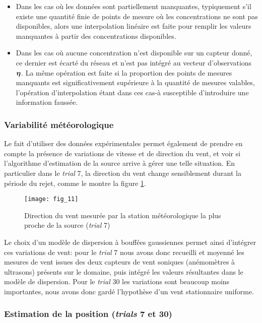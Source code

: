  \begin{itemize}
 	\item Dans les cas où les données sont partiellement manquantes, typiquement s'il existe une quantité finie de points de mesure où les concentrations ne sont pas disponibles, alors une interpolation linéaire est faite pour remplir les valeurs manquantes à partir des concentrations disponibles.
 	\item Dans les cas où aucune concentration n'est disponible sur un capteur donné, ce dernier est écarté du réseau et n'est pas intégré au vecteur d'observations ${\bm{\eta}}$. La même opération est faite si la proportion des points de mesures manquants est significativement supérieure à la quantité de mesures valables, l'opération d'interpolation étant dans ces cas-à susceptible d'introduire une information faussée.\\
 \end{itemize}
 
\subsubsection{Variabilité météorologique}

Le fait d'utiliser des données expérimentales permet également de prendre en compte la présence de variations de vitesse et de direction du vent, et voir si l'algorithme d'estimation de la source arrive à gérer une telle situation. En particulier dans le \textit{trial} 7, la direction du vent change sensiblement durant la période du rejet, comme le montre la figure \ref{fig_11_AE}.

\begin{figure}[h!]
	\centering
	\texttt{[image: fig\_11]}
	\caption{Direction du vent mesurée par la station météorologique la plus proche de la source (\textit{trial} 7)}
	\label{fig_11_AE}
\end{figure}

Le choix d'un modèle de dispersion à bouffées gaussiennes permet ainsi d'intégrer ces variations de vent: pour le \textit{trial} 7 nous avons donc recueilli et moyenné les mesures de vent issues des deux capteurs de vent soniques (anémomètres à ultrasons) présents sur le domaine, puis intégré les valeurs résultantes dans le modèle de dispersion. Pour le \textit{trial} 30 les variations sont beaucoup moins importantes, nous avons donc gardé l'hypothèse d'un vent stationnaire uniforme. \\

\subsubsection{Estimation de la position (\textit{trials} 7 et 30)}

